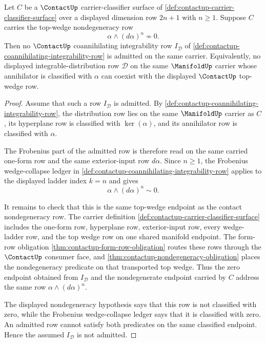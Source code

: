 \begin{theorem}
\label{thm:contact-top-wedge-excludes-coannihilating-integrability}
Let $C$ be a $\ContactUp$ carrier-classifier surface of \autoref{def:contactup-carrier-classifier-surface} over a displayed dimension row $2n+1$ with $n\ge1$. Suppose $C$ carries the top-wedge nondegeneracy row
$$
\alpha\wedge(d\alpha)^n\not\sim0.
$$
Then no $\ContactUp$ coannihilating integrability row $I_{\mathcal{D}}$ of \autoref{def:contactup-coannihilating-integrability-row} is admitted on the same carrier. Equivalently, no displayed integrable-distribution row $\mathcal{D}$ on the same $\ManifoldUp$ carrier whose annihilator is classified with $\alpha$ can coexist with the displayed $\ContactUp$ top-wedge row.
\end{theorem}
\begin{proof}
Assume that such a row $I_{\mathcal{D}}$ is admitted. By \autoref{def:contactup-coannihilating-integrability-row}, the distribution row lies on the same $\ManifoldUp$ carrier as $C$, its hyperplane row is classified with $\ker(\alpha)$, and its annihilator row is classified with $\alpha$.

The Frobenius part of the admitted row is therefore read on the same carried one-form row and the same exterior-input row $d\alpha$. Since $n\ge1$, the Frobenius wedge-collapse ledger in \autoref{def:contactup-coannihilating-integrability-row} applies to the displayed ladder index $k=n$ and gives
$$
\alpha\wedge(d\alpha)^n\sim0.
$$

It remains to check that this is the same top-wedge endpoint as the contact nondegeneracy row. The carrier definition \autoref{def:contactup-carrier-classifier-surface} includes the one-form row, hyperplane row, exterior-input row, every wedge-ladder row, and the top wedge row on one shared manifold endpoint. The form-row obligation \autoref{thm:contactup-form-row-obligation} routes these rows through the $\ContactUp$ consumer face, and \autoref{thm:contactup-nondegeneracy-obligation} places the nondegeneracy predicate on that transported top wedge. Thus the zero endpoint obtained from $I_{\mathcal{D}}$ and the nondegenerate endpoint carried by $C$ address the same row $\alpha\wedge(d\alpha)^n$.

The displayed nondegeneracy hypothesis says that this row is not classified with zero, while the Frobenius wedge-collapse ledger says that it is classified with zero. An admitted row cannot satisfy both predicates on the same classified endpoint. Hence the assumed $I_{\mathcal{D}}$ is not admitted.
\end{proof}
